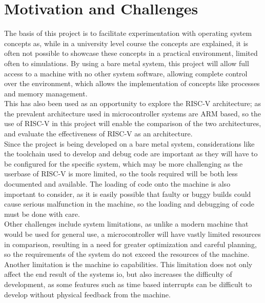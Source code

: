 \section{Motivation and Challenges}
The basis of this project is to facilitate experimentation with operating system concepts as, while in a university level course the concepts are explained, it is often not possible to showcase these concepts in a practical environment, limited often to simulations. By using a bare metal system, this project will allow full access to a machine with no other system software, allowing complete control over the environment, which allows the implementation of concepts like processes and memory management. \\
This has also been used as an opportunity to explore the RISC-V architecture; as the prevalent architecture used in microcontroller systems are ARM based, so the use of RISC-V in this project will enable the comparison of the two architectures, and evaluate the effectiveness of RISC-V as an architecture.\\
Since the project is being developed on a bare metal system, considerations like the toolchain used to develop and debug code are important as they will have to be configured for the specific system, which may be more challenging as the userbase of RISC-V is more limited, so the tools required will be both less documented and available. The loading of code onto the machine is also important to consider, as it is easily possible that faulty or buggy builds could cause serious malfunction in the machine, so the loading and debugging of code must be done with care.\\
Other challenges include system limitations, as unlike a modern machine that would be used for general use, a microcontroller will have vastly limited resources in comparison, resulting in a need for greater optimization and careful planning, so the requirements of the system do not exceed the resources of the machine. Another limitation is the machine \ac{io} capabilities. This limitation does not only affect the end result of the systems \ac{io}, but also increases the difficulty of development, as some features such as time based interrupts can be difficult to develop without physical feedback from the machine.


